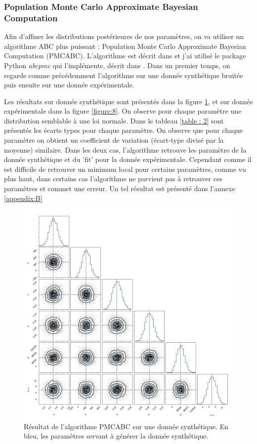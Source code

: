 \documentclass[a4paper,fleqn,leqno]{article}
\begin{document}
\subsubsection{Population Monte Carlo Approximate Bayesian Computation}

Afin d'affiner les distributions postérieures de nos paramètres, on va utiliser un algorithme ABC plus puissant : Population Monte Carlo Approximate Bayesian Computation (PMCABC). L'algorithme est décrit dans \cite{Beaumont} et j'ai utilisé le package Python \textit{abcpmc} qui l'implémente, décrit dans \cite{PMCABC}. Dans un premier temps, on regarde comme précédemment l'algorithme sur une donnée synthétique bruitée puis ensuite sur une donnée expérimentale.

Les résultats sur donnée synthétique sont présentés dans la figure \ref{figure:7}, et sur donnée expérimentale dans la figure \ref{figure:8}. On observe pour chaque paramètre une distribution semblable à une loi normale. Dans le tableau \ref{table : 2} sont présentés les écarts types pour chaque paramètre. On observe que pour chaque paramètre on obtient un coefficient de variation (écart-type divisé par la moyenne) similaire. Dans les deux cas, l'algorithme retrouve les paramètre de la donnée synthétique et du 'fit' pour la donnée expérimentale. Cependant comme il est difficile de retrouver un minimum local pour certains paramètres, comme vu plus haut, dans certains cas l'algorithme ne parvient pas à retrouver ces paramètres et commet une erreur. Un tel résultat est présenté dans l'annexe \ref{appendix:B}




\begin{figure}[H]
\centering
\includegraphics[scale=0.5]{abcpmc_synth}
\centering
\caption{Résultat de l'algorithme PMCABC sur une donnée synthétique. En bleu, les paramètres servant à générer la donnée synthétique.}
\label{figure:7}
\end{figure}
\end{document}
